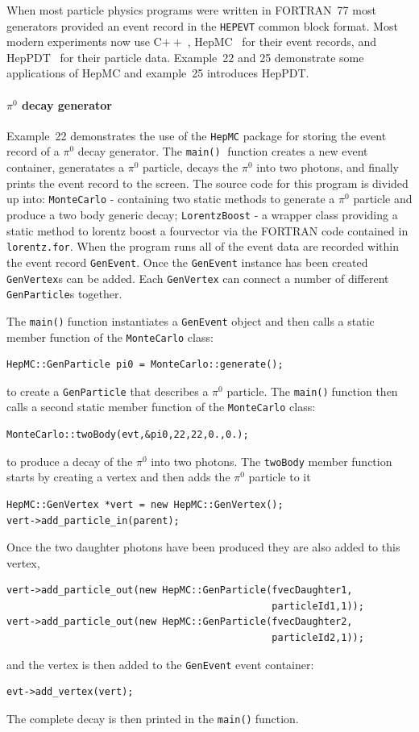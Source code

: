 \documentclass[11pt,a4paper]{scrartcl}
\def\cpp{C$++\;$}
\def\main{\texttt{main()}$\;$}
\begin{document}
When most particle physics programs were written in FORTRAN~77 most
generators provided an event record in the \texttt{HEPEVT} common
block format.  Most modern experiments now use \cpp,
HepMC~\cite{hepmc} for their event records, and HepPDT~\cite{heppdt}
for their particle data.  Example~22 and 25 demonstrate some
applications of HepMC and example~25 introduces HepPDT.

\paragraph{$\pi^0$ decay generator}

Example~22 demonstrates the use of the \texttt{HepMC} package for
storing the event record of a $\pi^0$ decay generator.  The \main
function creates a new event container, generatates a $\pi^0$
particle, decays the $\pi^0$ into two photons, and finally prints the
event record to the screen.  The source code for this program is
divided up into: \texttt{MonteCarlo} - containing two static methods
to generate a $\pi^0$ particle and produce a two body generic decay;
\texttt{LorentzBoost} - a wrapper class providing a static method to
lorentz boost a fourvector via the FORTRAN code contained in
\texttt{lorentz.for}.  When the program runs all of the event data are
recorded within the event record \texttt{GenEvent}.  Once the
\texttt{GenEvent} instance has been created
\texttt{GenVertex}s can be added.  Each
\texttt{GenVertex} can connect a number of different
\texttt{GenParticle}s together.  


The \main function instantiates a \texttt{GenEvent} object and then
calls a static member function of the \texttt{MonteCarlo} class:
%
\begin{verbatim}
HepMC::GenParticle pi0 = MonteCarlo::generate();
\end{verbatim}
%
to create a \texttt{GenParticle} that describes a $\pi^0$
particle.  The \main function then calls a second static member
function of the \texttt{MonteCarlo} class:
%
\begin{verbatim}
MonteCarlo::twoBody(evt,&pi0,22,22,0.,0.);
\end{verbatim}
%
to produce a decay of the $\pi^0$ into two photons.  The
\texttt{twoBody} member function starts by creating a vertex and then
adds the $\pi^0$ particle to it
%
\begin{verbatim}
HepMC::GenVertex *vert = new HepMC::GenVertex();
vert->add_particle_in(parent);
\end{verbatim}
%
Once the two daughter photons have been produced they are also added
to this vertex,
%
\begin{verbatim}
vert->add_particle_out(new HepMC::GenParticle(fvecDaughter1,
                                              particleId1,1));
vert->add_particle_out(new HepMC::GenParticle(fvecDaughter2,
                                              particleId2,1));
\end{verbatim}
%
and the vertex is then added to the \texttt{GenEvent} event container:
%
\begin{verbatim}
evt->add_vertex(vert);
\end{verbatim}
%
The complete decay is then printed in the \main function.
\end{document}
